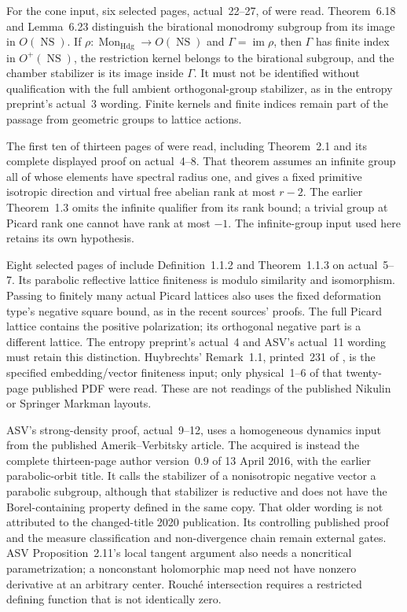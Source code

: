 For the cone input, six selected pages, actual~22--27, of
\cite{Markman11SurveyV3} were read. Theorem~6.18 and
Lemma~6.23 distinguish the birational monodromy subgroup from
its image in $O(\operatorname{NS})$. If
$\rho:\operatorname{Mon}_{\mathrm{Hdg}}\to
O(\operatorname{NS})$ and $\Gamma=\operatorname{im}\rho$,
then $\Gamma$ has finite index in $O^+(\operatorname{NS})$,
the restriction kernel belongs to the birational subgroup,
and the chamber stabilizer is its image inside $\Gamma$.
It must not be identified without qualification with the full
ambient orthogonal-group stabilizer, as in the entropy preprint's
actual~3 wording. Finite kernels and finite indices remain
part of the passage from geometric groups to lattice actions.

The first ten of thirteen pages of \cite{Oguiso05EntropyV5}
were read, including Theorem~2.1 and its complete displayed
proof on actual~4--8. That theorem assumes an infinite group
all of whose elements have spectral radius one, and gives a
fixed primitive isotropic direction and virtual free abelian
rank at most $r-2$. The earlier Theorem~1.3 omits the infinite
qualifier from its rank bound; a trivial group at Picard rank
one cannot have rank at most $-1$. The infinite-group input
used here retains its own hypothesis.

Eight selected pages of \cite{Nikulin95ReflectionV6} include
Definition~1.1.2 and Theorem~1.1.3 on actual~5--7. Its
parabolic reflective lattice finiteness is modulo similarity
and isomorphism. Passing to finitely many actual Picard
lattices also uses the fixed deformation type's negative
square bound, as in the recent sources' proofs. The full
Picard lattice contains the positive polarization; its
orthogonal negative part is a different lattice. The entropy
preprint's actual~4 and ASV's actual~11 wording must retain
this distinction. Huybrechts' Remark~1.1, printed~231 of
\cite{Huybrechts18PolarizedPublished}, is the specified
embedding/vector finiteness input; only physical~1--6 of that
twenty-page published PDF were read. These are not readings
of the published Nikulin or Springer Markman layouts.

ASV's strong-density proof, actual~9--12, uses a homogeneous
dynamics input from the published Amerik--Verbitsky article.
The acquired \cite{AmerikVerbitsky16AuthorOrbits} is instead
the complete thirteen-page author version~0.9 of 13 April
2016, with the earlier parabolic-orbit title. It calls the
stabilizer of a nonisotropic negative vector a parabolic
subgroup, although that stabilizer is reductive and does not
have the Borel-containing property defined in the same copy.
That older wording is not attributed to the changed-title
2020 publication. Its controlling published proof and the
measure classification and non-divergence chain remain
external gates. ASV Proposition~2.11's local tangent argument
also needs a noncritical parametrization; a nonconstant
holomorphic map need not have nonzero derivative at an
arbitrary center. Rouch\'e intersection requires a restricted
defining function that is not identically zero.

